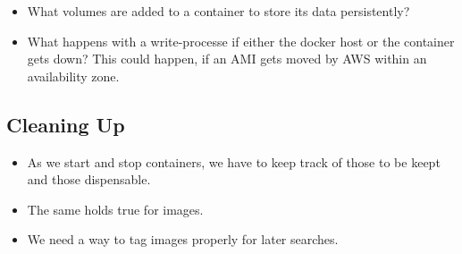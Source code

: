 \documentclass[captions=tableheading]{article}
\begin{document}
\begin{itemize}
\item What volumes are added to a container to store its data persistently?
\item What happens with a write-processe if either the docker host or the container gets down? This could happen, if an AMI gets moved by AWS within an availability zone.
\end{itemize}
\subsection{Cleaning Up}
\label{sec-10-4}

\begin{itemize}
\item As we start and stop containers, we have to keep track of those to be keept and those dispensable.
\item The same holds true for images.
\item We need a way to tag images properly for later searches.
\end{itemize}
\end{document}
